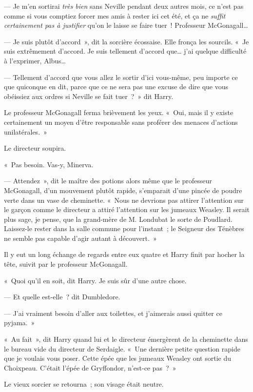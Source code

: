 --- Je m'en sortirai \emph{très bien} sans Neville pendant deux autres mois, ce n'est pas comme si vous comptiez forcer mes amis à rester ici cet été, et ça ne \emph{suffit certainement pas à justifier} qu'on le laisse se faire tuer~!
Professeur McGonagall…

--- Je suis plutôt d'accord~», dit la sorcière écossaise.
Elle fronça les sourcils.
«~Je suis extrêmement d'accord.
Je suis tellement d'accord que… j'ai quelque difficulté à l'exprimer, Albus…

--- Tellement d'accord que vous allez le sortir d'ici vous-même, peu importe ce que quiconque en dit, parce que ce ne sera pas une excuse de dire que vous obéissiez aux ordres si Neville se fait tuer~?~»
dit Harry.

Le professeur McGonagall ferma brièvement les yeux.
«~Oui, mais il y existe certainement un moyen d'être responsable sans proférer des menaces d'actions unilatérales.~»

Le directeur soupira.

«~Pas besoin.
Vas-y, Minerva.

--- Attendez~», dit le maître des potions alors même que le professeur McGonagall, d'un mouvement plutôt rapide, s'emparait d'une pincée de poudre verte dans un vase de cheminette.
«~Nous ne devrions pas attirer l'attention sur le garçon comme le directeur a attiré l'attention sur les jumeaux Weasley.
Il serait plus sage, je pense, que la grand-mère de M. Londubat le sorte de Poudlard.
Laissez-le rester dans la salle commune pour l'instant~; le Seigneur des Ténèbres ne semble pas capable d'agir autant à découvert.~»

Il y eut un long échange de regards entre eux quatre et Harry finit par hocher la tête, suivit par le professeur McGonagall.

«~Quoi qu'il en soit, dit Harry.
Je suis sûr d'une autre chose.

--- Et quelle est-elle~? dit Dumbledore.

--- J'ai vraiment besoin d'aller aux toilettes, et j'aimerais aussi quitter ce pyjama.~»

\later

«~Au fait~», dit Harry quand lui et le directeur émergèrent de la cheminette dans le bureau vide du directeur de Serdaigle.
«~Une dernière petite question rapide que je voulais vous poser.
Cette épée que les jumeaux Weasley ont sortie du Choixpeau.
C'était l'épée de Gryffondor, n'est-ce pas~?~»

Le vieux sorcier se retourna~; son visage était neutre.

